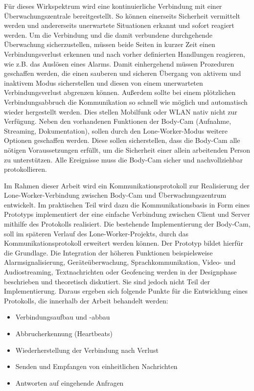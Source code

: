 \documentclass[thesis.tex]{subfiles}
\begin{document}
Für dieses Wirkspektrum wird eine kontinuierliche Verbindung mit einer Überwachungszentrale bereitgestellt.
So können einerseits Sicherheit vermittelt werden und andererseits unerwartete Situationen erkannt und sofort reagiert werden.
Um die Verbindung und die damit verbundene durchgehende Überwachung sicherzustellen, müssen beide Seiten in kurzer Zeit einen Verbindungsverlust erkennen und nach vorher definierten Handlungen reagieren, wie z.B. das Auslösen eines Alarms.
Damit einhergehend müssen Prozeduren geschaffen werden, die einen sauberen und sicheren Übergang von aktivem und inaktivem Modus sicherstellen und diesen von einem unerwarteten Verbindungsverlust abgrenzen können.
Außerdem sollte bei einem plötzlichen Verbindungsabbruch die Kommunikation so schnell wie möglich und automatisch wieder hergestellt werden.
Dies stellen Mobilfunk oder WLAN nativ nicht zur Verfügung.
Neben den vorhandenen Funktionen der Body-Cam (Aufnahme, Streaming, Dokumentation), sollen durch den Lone-Worker-Modus weitere Optionen geschaffen werden.
Diese sollen sicherstellen, dass die Body-Cam alle nötigen Voraussetzungen erfüllt, um die Sicherheit einer allein arbeitenden Person zu unterstützen.
Alle Ereignisse muss die Body-Cam sicher und nachvollziehbar protokollieren.

Im Rahmen dieser Arbeit wird ein Kommunikationsprotokoll zur Realisierung der Lone-Worker-Verbindung zwischen Body-Cam und Überwachungszentrum entwickelt.
Im praktischen Teil wird dazu die Kommunikationsbasis in Form eines Prototyps implementiert der eine einfache Verbindung zwischen Client und Server mithilfe des Protokolls realisiert.
Die bestehende Implementierung der Body-Cam, soll im späteren Verlauf des Lone-Worker-Projekts, durch das Kommunikationsprotokoll erweitert werden können.
Der Prototyp bildet hierfür die Grundlage.
Die Integration der höheren Funktionen beispielsweise Alarmsignalisierung, Geräteüberwachung, Sprachkommunikation, Video- und Audiostreaming, Textnachrichten oder Geofencing werden in der Designphase beschrieben und theoretisch diskutiert.
Sie sind jedoch nicht Teil der Implementierung.
Daraus ergeben sich folgende Punkte für die Entwicklung eines Protokolls, die innerhalb der Arbeit behandelt werden:
\begin{itemize}
    \item Verbindungsaufbau und -abbau
    \item Abbrucherkennung (Heartbeats)
    \item Wiederherstellung der Verbindung nach Verlust
    \item Senden und Empfangen von einheitlichen Nachrichten
    \item Antworten auf eingehende Anfragen
\end{itemize}
\end{document}
